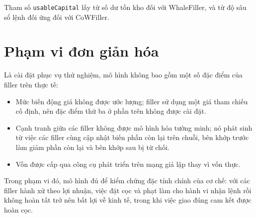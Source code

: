 \documentclass[../DoAn.tex]{subfiles}
\begin{document}
Tham số \texttt{usableCapital} lấy từ số dư tồn kho đối với WhaleFiller, và từ độ sâu sổ lệnh đối ứng đối với CoWFiller.

\section{Phạm vi đơn giản hóa}

Là cài đặt phục vụ thử nghiệm, mô hình không bao gồm một số đặc điểm của filler trên thực tế:
\begin{itemize}
    \item Mức biến động giá không được ước lượng; filler sử dụng một giá tham chiếu cố định, nên đặc điểm thứ ba ở phần trên không được cài đặt.
    \item Cạnh tranh giữa các filler không được mô hình hóa tường minh; nó phát sinh từ việc các filler cùng cập nhật biến phần còn lại trên chuỗi, bên khớp trước làm giảm phần còn lại và bên khớp sau bị từ chối.
    \item Vốn được cấp qua công cụ phát triển trên mạng giả lập thay vì vốn thực.
\end{itemize}

Trong phạm vi đó, mô hình đủ để kiểm chứng đặc tính chính của cơ chế: với các filler hành xử theo lợi nhuận, việc đặt cọc và phạt làm cho hành vi nhận lệnh rồi không hoàn tất trở nên bất lợi về kinh tế, trong khi việc giao đúng cam kết được hoàn cọc.
\end{document}
